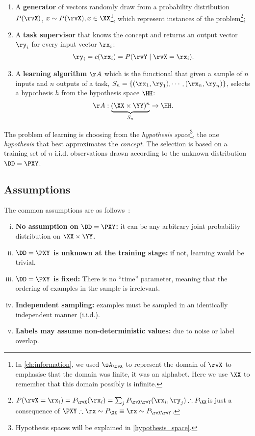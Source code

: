 \begin{enumerate}
	\item A \textbf{generator} of vectors randomly draw from a probability distribution \(P(\rvX)\), \(x\sim P(\rvX), x \in \XX \)\footnote{In \cref{ch:information}, we used $\sA_{\rvX}$ to represent the domain of $\rvX$ to emphasise that the domain was finite, it was an alphabet. Here we use $\XX$ to remember that this domain possibly is infinite.}, which represent instances of the problem\footnote{\(P(\rvX=\rx_i) = P_{\rvX}(\rx_i) = \sum_j P_{\rvX\rvY}(\rx_i, \ry_j) \therefore P_{\XX}\)is just a consequence of \(\PXY \therefore \rx \sim P_{\XX} \equiv \rx \sim P_{\rvX\rvY}\).};
	\item A \textbf{task supervisor} that knows the concept and returns an output vector \(\ry_i\) for every input vector \(\rx_i\):
	\begin{align}
		\ry_i = c(\rx_i) = P(\rvY \mid \rvX=\rx_i).
	\end{align}
	\item A \textbf{learning algorithm} \(\AA\) which is the functional that given a sample of \(n\) inputs and \(n\) outputs of a task, \(S_n = \{(\rx_1,\ry_1), \cdots, (\rx_n, \ry_n)\}\), selects a hypothesis \(h\) from the hypothesis space \(\HH\):
	\begin{align}
		\AA: \underbrace{(\XX \times \YY)^n}_{S_n} \to \HH .
	\end{align}
\end{enumerate}

The problem of learning is choosing from the \emph{hypothesis space}\footnote{Hypothesis spaces will be explained in \cref{hypothesis_space}.}, the one \emph{hypothesis} that best approximates the \emph{concept}. The selection is based on a training set of \(n\) i.i.d. observations drawn according to the unknown distribution \(\DD= \PXY\).

\subsection{Assumptions}\label{mlt_assumptions} The common assumptions are as follows~\cite{mello:2018, luxburg:2011}:
\begin{enumerate}
	[i.]
	\item \textbf{No assumption on \(\DD=\PXY\): } it can be any arbitrary joint probability distribution on \(\XX \times \YY\).\label{distribution-free}
	\item \textbf{\(\DD=\PXY\) is unknown at the training stage:} if not, learning would be trivial.
	\item \textbf{\(\DD=\PXY\) is fixed:} There is no ``time'' parameter, meaning that the ordering of examples in the sample is irrelevant\label{no-time}.
	\item \textbf{Independent sampling:} examples must be sampled in an identically independent manner (i.i.d.).\label{independent_sampling}
	\item \textbf{Labels may assume non-deterministic values:} due to noise or label overlap.
\end{enumerate}

